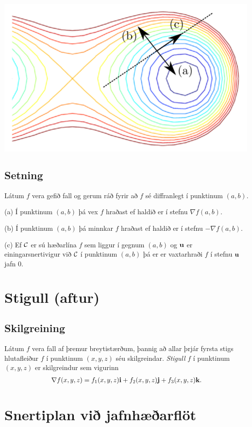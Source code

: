 \documentclass[a4paper,10pt,icelandic]{sphinxmanual}
\begin{document}
{\hfill\includegraphics[width=0.500\linewidth]{contours.png}\hfill}


\subsection{Setning}
\label{Kafli2:id46}
Látum \(f\) vera gefið fall og gerum ráð fyrir að \(f\) sé
diffranlegt í punktinum \((a,b)\).

(a) Í punktinum \((a,b)\) þá vex \(f\) hraðast ef haldið er í
stefnu \(\nabla f(a,b)\).

(b) Í punktinum \((a,b)\) þá minnkar \(f\) hraðast ef haldið er
í stefnu \(-\nabla f(a,b)\).

(c) Ef \(\cal C\) er sú hæðarlína \(f\) sem liggur í gegnum
\((a,b)\) og \(\mbox{${\bf u}$}\) er einingarsnertivigur við
\(\cal C\) í punktinum \((a,b)\) þá er er vaxtarhraði \(f\)
í stefnu \(\mbox{${\bf u}$}\) jafn 0.


\section{Stigull (aftur)}
\label{Kafli2:stigull-aftur}

\subsection{Skilgreining}
\label{Kafli2:id47}
Látum \(f\) vera fall af þremur breytistærðum, þannig að allar þrjár
fyrsta stigs hlutafleiður \(f\) í punktinum \((x,y,z)\) séu
skilgreindar. \emph{Stigull} \(f\) í punktinum \((x,y,z)\) er
skilgreindur sem vigurinn
\begin{gather}
\begin{split}\displaystyle \nabla f(x,y,z)=f_1(x,y,z)\mbox{${\bf i}$}+f_2(x,y,z)\mbox{${\bf j}$}+f_3(x,y,z)\mbox{${\bf k}$}.\end{split}\notag
\end{gather}

\section{Snertiplan við jafnhæðarflöt}
\label{Kafli2:index-24}\label{Kafli2:snertiplan-vi-jafnhaearflot}
\end{document}
